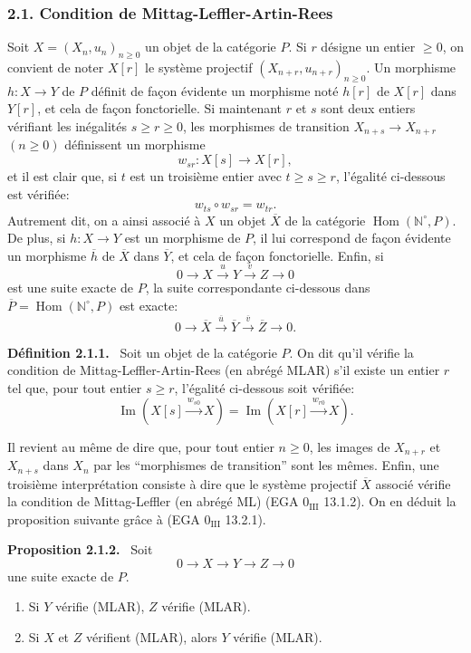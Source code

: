 \documentclass[11pt]{article}
\providecommand{\NN}{\mathbb{N}}
\newenvironment{statement}[1]{\par\medskip\noindent\textbf{#1.}\ }{\par\medskip}
\DeclareMathOperator{\Hom}{Hom}
\providecommand{\Hom}{\operatorname{Hom}}
\providecommand{\NN}{\mathbb N}
\providecommand{\Im}{\operatorname{Im}}
\renewcommand{\Im}{\operatorname{Im}}
\providecommand{\Im}{\operatorname{Im}}
\providecommand{\Hom}{\operatorname{Hom}}
\begin{document}
\subsubsection*{2.1. Condition de Mittag-Leffler-Artin-Rees}
Soit $X=(X_n,u_n)_{n\ge0}$ un objet de la catégorie $P$. Si $r$ désigne un entier $\ge0$, on convient de noter $X[r]$ le système projectif $(X_{n+r},u_{n+r})_{n\ge0}$. Un morphisme $h:X\to Y$ de $P$ définit de façon évidente un morphisme noté $h[r]$ de $X[r]$ dans $Y[r]$, et cela de façon fonctorielle. Si maintenant $r$ et $s$ sont deux entiers vérifiant les inégalités $s\ge r\ge0$, les morphismes de transition $X_{n+s}\to X_{n+r}$ $(n\ge0)$ définissent un morphisme
\[
w_{sr}:X[s]\longrightarrow X[r],
\]
et il est clair que, si $t$ est un troisième entier avec $t\ge s\ge r$, l'égalité ci-dessous est vérifiée:
\[
w_{ts}\circ w_{sr}=w_{tr}.
\]
Autrement dit, on a ainsi associé à $X$ un objet $\overline X$ de la catégorie $\Hom(\NN^\circ,P)$. De plus, si $h:X\to Y$ est un morphisme de $P$, il lui correspond de façon évidente un morphisme $\overline h$ de $\overline X$ dans $\overline Y$, et cela de façon fonctorielle. Enfin, si
\[
0\longrightarrow X\stackrel{u}{\longrightarrow}Y\stackrel{v}{\longrightarrow}Z\longrightarrow0
\]
est une suite exacte de $P$, la suite correspondante ci-dessous dans $\overline P=\Hom(\NN^\circ,P)$ est exacte:
\[
0\longrightarrow\overline X\stackrel{\overline u}{\longrightarrow}\overline Y\stackrel{\overline v}{\longrightarrow}\overline Z\longrightarrow0.
\]

\begin{statement}{Définition 2.1.1}
Soit un objet de la catégorie $P$. On dit qu'il vérifie la condition de Mittag-Leffler-Artin-Rees (en abrégé MLAR) s'il existe un entier $r$ tel que, pour tout entier $s\ge r$, l'égalité ci-dessous soit vérifiée:
\[
\Im(X[s]\xrightarrow{w_{s0}}X)=\Im(X[r]\xrightarrow{w_{r0}}X).
\]
\end{statement}
Il revient au même de dire que, pour tout entier $n\ge0$, les images de $X_{n+r}$ et $X_{n+s}$ dans $X_n$ par les ``morphismes de transition'' sont les mêmes. Enfin, une troisième interprétation consiste à dire que le système projectif $\overline X$ associé vérifie la condition de Mittag-Leffler (en abrégé ML) (EGA $0_{\mathrm{III}}$ 13.1.2). On en déduit la proposition suivante grâce à (EGA $0_{\mathrm{III}}$ 13.2.1).

\begin{statement}{Proposition 2.1.2}
Soit
\[
0\longrightarrow X\longrightarrow Y\longrightarrow Z\longrightarrow0
\]
une suite exacte de $P$.
\begin{enumerate}[label=(\roman*)]
\item Si $Y$ vérifie (MLAR), $Z$ vérifie (MLAR).
\item Si $X$ et $Z$ vérifient (MLAR), alors $Y$ vérifie (MLAR).
\end{enumerate}
\end{statement}
\end{document}
